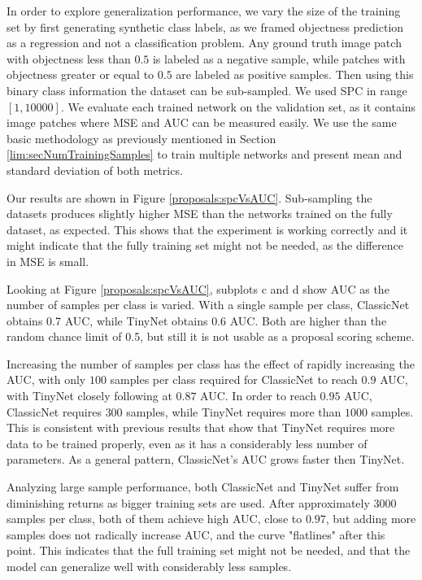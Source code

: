 In order to explore generalization performance, we vary the size of the training set by first generating synthetic class labels, as we framed objectness prediction as a regression and not a classification problem. Any ground truth image patch with objectness less than $0.5$ is labeled as a negative sample, while patches with objectness greater or equal to $0.5$ are labeled as positive samples. Then using this binary class information the dataset can be sub-sampled. We used SPC in range $[1,10000]$.
We evaluate each trained network on the validation set, as it contains image patches where MSE and AUC can be measured easily. We use the same basic methodology as previously mentioned in Section \ref{lim:secNumTrainingSamples} to train multiple networks and present mean and standard deviation of both metrics.

Our results are shown in Figure \ref{proposals:spcVsAUC}. Sub-sampling the datasets produces slightly higher MSE than the networks trained on the fully dataset, as expected. This shows that the experiment is working correctly and it might indicate that the fully training set might not be needed, as the difference in MSE is small.

Looking at Figure \ref{proposals:spcVsAUC}, subplots c and d show AUC as the number of samples per class is varied. With a single sample per class, ClassicNet obtains 0.7 AUC, while TinyNet obtains 0.6 AUC. Both are higher than the random chance limit of 0.5, but still it is not usable as a proposal scoring scheme.

Increasing the number of samples per class has the effect of rapidly increasing the AUC, with only $100$ samples per class required for ClassicNet to reach $0.9$ AUC, with TinyNet closely following at $0.87$ AUC. In order to reach $0.95$ AUC, ClassicNet requires $300$ samples, while TinyNet requires more than $1000$ samples. This is consistent with previous results that show that TinyNet requires more data to be trained properly, even as it has a considerably less number of parameters. As a general pattern, ClassicNet's AUC grows faster then TinyNet.

Analyzing large sample performance, both ClassicNet and TinyNet suffer from diminishing returns as bigger training sets are used. After approximately 3000 samples per class, both of them achieve high AUC, close to $0.97$, but adding more samples does not radically increase AUC, and the curve "flatlines" after this point. This indicates that the full training set might not be needed, and that the model can generalize well with considerably less samples.

